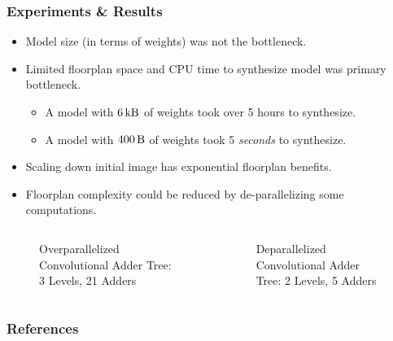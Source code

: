 \documentclass[english]{beamer}
\begin{document}
\begin{frame}
\frametitle{Experiments \& Results}
\begin{itemize}
	\item Model size (in terms of weights) was not the bottleneck.
	\item Limited floorplan space and CPU time to synthesize model was primary
	bottleneck.
	\begin{itemize}
		\item A model with $\SI{6}{\kilo\byte}$ of weights took over 5 hours to
		synthesize.
		\item A model with $\SI{400}{\byte}$ of weights took 5 \emph{seconds}
		to synthesize.
	\end{itemize}
	\item Scaling down initial image has exponential floorplan benefits.
	\item Floorplan complexity could be reduced by de-parallelizing some
	computations.
\end{itemize}
\begin{columns}
\begin{figure}
	\centering
	
	\caption*{Overparallelized Convolutional Adder Tree: 3 Levels, 21 Adders}
\end{figure}
\begin{figure}
	\centering
	
	\caption*{Deparallelized Convolutional Adder Tree: 2 Levels, 5 Adders}
\end{figure}
\end{columns}
\end{frame}


\begin{frame}[allowframebreaks]
\frametitle{References}
\tiny\printbibliography
\end{frame}
\end{document}
